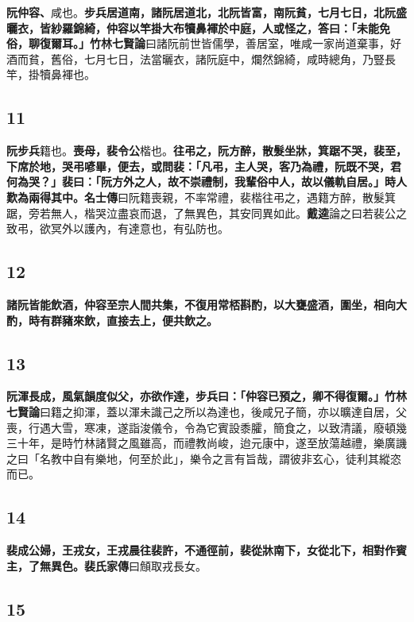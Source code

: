 \textbf{阮仲容、}{\footnotesize 咸也。}\textbf{步兵居道南，諸阮居道北，北阮皆富，南阮貧，七月七日，北阮盛曬衣，皆紗羅錦綺，仲容以竿掛大布犢鼻褌於中庭，人或怪之，答曰：「未能免俗，聊復爾耳。」}{\footnotesize \textbf{竹林七賢論}曰諸阮前世皆儒學，善居室，唯咸一家尚道棄事，好酒而貧，舊俗，七月七日，法當曬衣，諸阮庭中，爛然錦綺，咸時總角，乃豎長竿，掛犢鼻褌也。}

\subsection*{11}

\textbf{阮步兵}{\footnotesize 籍也。}\textbf{喪母，裴令公}{\footnotesize 楷也。}\textbf{往弔之，阮方醉，散髮坐牀，箕踞不哭，裴至，下席於地，哭弔喭畢，便去，或問裴：「凡弔，主人哭，客乃為禮，阮既不哭，君何為哭？」裴曰：「阮方外之人，故不崇禮制，我輩俗中人，故以儀軌自居。」時人歎為兩得其中。}{\footnotesize \textbf{名士傳}曰阮籍喪親，不率常禮，裴楷往弔之，遇籍方醉，散髮箕踞，旁若無人，楷哭泣盡哀而退，了無異色，其安同異如此。\textbf{戴逵}論之曰若裴公之致弔，欲冥外以護內，有達意也，有弘防也。}

\subsection*{12}

\textbf{諸阮皆能飲酒，仲容至宗人間共集，不復用常桮斟酌，以大甕盛酒，圍坐，相向大酌，時有群豬來飲，直接去上，便共飲之。}

\subsection*{13}

\textbf{阮渾長成，風氣韻度似父，亦欲作達，步兵曰：「仲容已預之，卿不得復爾。」}{\footnotesize \textbf{竹林七賢論}曰籍之抑渾，蓋以渾未識己之所以為達也，後咸兄子簡，亦以曠達自居，父喪，行遇大雪，寒凍，遂詣浚儀令，令為它賓設黍臛，簡食之，以致清議，廢頓幾三十年，是時竹林諸賢之風雖高，而禮教尚峻，迨元康中，遂至放蕩越禮，樂廣譏之曰「名教中自有樂地，何至於此」，樂令之言有旨哉，謂彼非玄心，徒利其縱恣而已。}

\subsection*{14}

\textbf{裴成公婦，王戎女，王戎晨往裴許，不通徑前，裴從牀南下，女從北下，相對作賓主，了無異色。}{\footnotesize \textbf{裴氏家傳}曰頠取戎長女。}

\subsection*{15}

